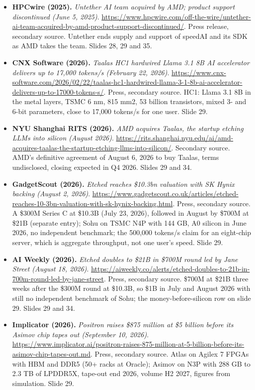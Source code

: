 \documentclass[11pt,letterpaper]{article}
\begin{document}
\begin{itemize}[leftmargin=1.2em,itemsep=3pt]
\item \textbf{HPCwire (2025).} \textit{Untether AI team acquired by AMD; product support discontinued (June 5, 2025)}. \url{https://www.hpcwire.com/off-the-wire/untether-ai-team-acquired-by-amd-product-support-discontinued/}. Press release, secondary source. Untether ends supply and support of speedAI and its SDK as AMD takes the team. Slides 28, 29 and 35.
\item \textbf{CNX Software (2026).} \textit{Taalas HC1 hardwired Llama 3.1 8B AI accelerator delivers up to 17,000 tokens/s (February 22, 2026)}. \url{https://www.cnx-software.com/2026/02/22/taalas-hc1-hardwired-llama-3-1-8b-ai-accelerator-delivers-up-to-17000-tokens-s/}. Press, secondary source. HC1: Llama 3.1 8B in the metal layers, TSMC 6 nm, 815 mm2, 53 billion transistors, mixed 3- and 6-bit parameters, close to 17,000 tokens/s for one user. Slide 29.
\item \textbf{NYU Shanghai RITS (2026).} \textit{AMD acquires Taalas, the startup etching LLMs into silicon (August 2026)}. \url{https://rits.shanghai.nyu.edu/ai/amd-acquires-taalas-the-startup-etching-llms-into-silicon/}. Secondary source. AMD's definitive agreement of August 6, 2026 to buy Taalas, terms undisclosed, closing expected in Q4 2026. Slides 29 and 34.
\item \textbf{GadgetScout (2026).} \textit{Etched reaches \$10.3bn valuation with SK Hynix backing (August 2, 2026)}. \url{https://www.gadgetscout.co.uk/articles/etched-reaches-10-3bn-valuation-with-sk-hynix-backing.html}. Press, secondary source. A \$300M Series C at \$10.3B (July 23, 2026), followed in August by \$700M at \$21B (separate entry); Sohu on TSMC N4P with 144 GB, A0 silicon in June 2026, no independent benchmark; the 500,000 tokens/s claim for an eight-chip server, which is aggregate throughput, not one user's speed. Slide 29.
\item \textbf{AI Weekly (2026).} \textit{Etched doubles to \$21B in \$700M round led by Jane Street (August 18, 2026)}. \url{https://aiweekly.co/alerts/etched-doubles-to-21b-in-700m-round-led-by-jane-street}. Press, secondary source. \$700M at \$21B three weeks after the \$300M round at \$10.3B, so \$1B in July and August 2026 with still no independent benchmark of Sohu; the money-before-silicon row on slide 29. Slides 29 and 34.
\item \textbf{Implicator (2026).} \textit{Positron raises \$875 million at \$5 billion before its Asimov chip tapes out (September 10, 2026)}. \url{https://www.implicator.ai/positron-raises-875-million-at-5-billion-before-its-asimov-chip-tapes-out.md}. Press, secondary source. Atlas on Agilex 7 FPGAs with HBM and DDR5 (50+ racks at Oracle); Asimov on N3P with 288 GB to 2.3 TB of LPDDR5X, tape-out end 2026, volume H2 2027, figures from simulation. Slide 29.

\end{itemize}
\end{document}
